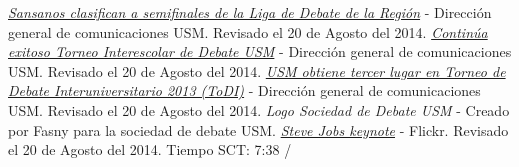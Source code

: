 \documentclass{article}
\begin{document}
\begin{adjustwidth}{-1.5cm}{-1.5cm}
	\begin{thebibliography}{x}
			\href{http://www.comunicaciones.usm.cl/2011/07/08/sansanos-clasifican-a-semifinales-de-la-liga-de-debate-de-la-region/}
			{\textit{Sansanos clasifican a semifinales de la Liga de Debate de
			la Región}} - Dirección general de comunicaciones USM. Revisado el
			20 de Agosto del 2014.
			\href{http://www.comunicaciones.usm.cl/2012/08/29/continua-exitoso-torneo-interescolar-de-debate-usm/}
			{\textit{Continúa exitoso Torneo Interescolar de Debate USM}} -
			Dirección general de comunicaciones USM. Revisado el 20 de Agosto del 2014.
			\href{http://www.dgc.usm.cl/2013/03/21/usm-obtiene-tercer-lugar-en-torneo-de-debate-interuniversitario-2013-todi/}
			{\textit{USM obtiene tercer lugar en Torneo de Debate Interuniversitario
			2013 (ToDI)}} - Dirección general de comunicaciones USM. Revisado el
			20 de Agosto del 2014.
			\textit{Logo Sociedad de Debate USM} - Creado por Fasny para la
			sociedad de debate USM.
			\href{http://www.flickr.com/photos/acaben/541420967/in/set-72157603723478753/}
			{\textit{Steve Jobs keynote}} - Flickr. Revisado el 20 de Agosto del 2014.
\vfill\hfill Tiempo SCT: 7:38 / \LaTeXe
	\end{thebibliography}
\end{adjustwidth}
\end{document}
